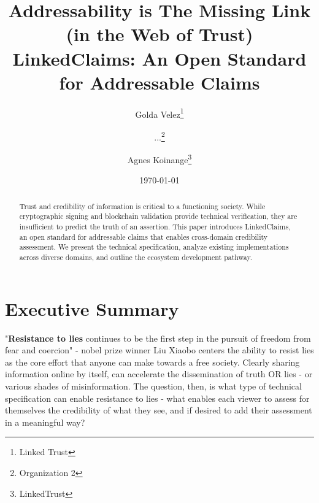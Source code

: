 \documentclass[11pt]{article}
\title{Addressability is The Missing Link (in the Web of Trust)\\[0.5em]\Large LinkedClaims: An Open Standard for Addressable Claims}
\author{
    Golda Velez\thanks{Linked Trust} \and
    ...\thanks{Organization 2} \and
    Agnes Koinange\thanks{LinkedTrust}
}
\date{\today}
\begin{document}
\maketitle

\begin{abstract}
Trust and credibility of information is critical to a functioning society. While cryptographic signing and blockchain validation provide technical verification, they are insufficient to predict the truth of an assertion. This paper introduces LinkedClaims, an open standard for addressable claims that enables cross-domain credibility assessment. We present the technical specification, analyze existing implementations across diverse domains, and outline the ecosystem development pathway.
\end{abstract}

\section{Executive Summary}

"\textbf{Resistance to lies} continues to be the first step in the pursuit of freedom from fear and coercion"\cite{1} - nobel prize winner Liu Xiaobo centers the ability to resist lies as the core effort that anyone can make towards a free society.  Clearly sharing information online by itself, can accelerate the dissemination of truth OR lies - or various shades of misinformation.  The question, then, is what type of technical specification can enable resistance to lies - what enables each viewer to assess for themselves the credibility of what they see, and if desired to add their assessment in a meaningful way?  
\end{document}
